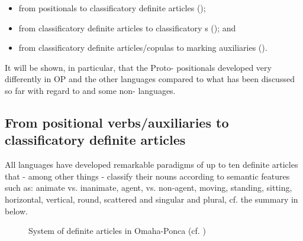 \documentclass[output=paper]{langsci/langscibook}
\begin{document}
\begin{itemize}
\item
from positionals to classificatory definite articles ();
\item
from classificatory definite articles to classificatory s (); and
\item
from classificatory definite articles\slash copulas to  marking auxiliaries ().
\end{itemize}


It will be shown, in particular, that the Proto- positionals developed very differently in OP and the other  languages compared to what has been discussed so far with regard to  and some non-  languages. 

\subsection{{From positional verbs/auxiliaries} {to classificatory definite articles}}\label{sec:helmbrecht:6.1}

All  languages have developed remarkable paradigms of up to ten definite articles that - among other things - classify their nouns according to semantic features such as: animate vs. inanimate, agent, vs. non-agent, moving, standing, sitting, horizontal, vertical, round, scattered and singular and plural, cf. the summary in  below.


\begin{figure}
\caption{System of definite articles in Omaha-Ponca (cf. \citealt[144]{Koontz1984})}
\label{fig:helmbrecht:1}
\end{figure}
       
\end{document}
